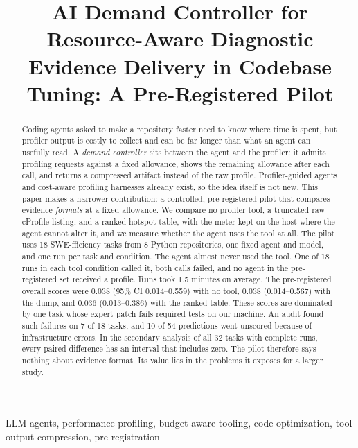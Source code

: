 \documentclass[conference]{IEEEtran}
\begin{document}
\title{AI Demand Controller for Resource-Aware Diagnostic Evidence Delivery in Codebase Tuning: A Pre-Registered Pilot}

\author{
}

\maketitle

\begin{abstract}
Coding agents asked to make a repository faster need to know where time is
spent, but profiler output is costly to collect and can be far longer than
what an agent can usefully read. A \emph{demand controller} sits between the
agent and the profiler: it admits profiling requests against a fixed
allowance, shows the remaining allowance after each call, and returns a
compressed artifact instead of the raw profile. Profiler-guided agents and
cost-aware profiling harnesses already exist, so the idea itself is not new.
This paper makes a narrower contribution: a controlled, pre-registered pilot
that compares evidence \emph{formats} at a fixed allowance. We compare no
profiler tool, a truncated raw cProfile listing, and a ranked hotspot table,
with the meter kept on the host where the agent cannot alter it, and we
measure whether the agent uses the tool at all. The pilot uses 18
SWE-fficiency tasks from 8 Python repositories, one fixed agent and model, and
one run per task and condition. The agent almost never used the tool. One of
18 runs in each tool condition called it, both calls failed, and no agent in
the pre-registered set received a profile. Runs took 1.5 minutes on average.
The pre-registered overall scores were 0.038 (95\% CI 0.014--0.559) with no
tool, 0.038 (0.014--0.567) with the dump, and 0.036 (0.013--0.386) with the
ranked table. These scores are dominated by one task whose expert patch fails
required tests on our machine. An audit found such failures on 7 of 18 tasks,
and 10 of 54 predictions went unscored because of infrastructure errors. In
the secondary analysis of all 32 tasks with complete runs, every paired
difference has an interval that includes zero. The pilot therefore says
nothing about evidence format. Its value lies in the problems it exposes for
a larger study.
\end{abstract}

\begin{IEEEkeywords}
LLM agents, performance profiling, budget-aware tooling, code optimization,
tool output compression, pre-registration
\end{IEEEkeywords}
\end{document}

